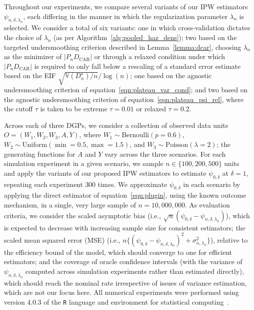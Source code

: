 Throughout our experiments, we compare several variants of our IPW estimators
$\psi_{n,\delta,\lambda_n}$, each differing in the manner in which the
regularization parameter $\lambda_n$ is selected. We consider a total of six
variants: one in which cross-validation dictates the choice of $\lambda_n$ (as
per Algorithm~\ref{alg:pooled_haz_dens}); two based on the targeted
undersmoothing criterion described in Lemma~\ref{lemma:dcar}, choosing
$\lambda_n$ as the minimizer of $\lvert P_n D_\text{CAR} \rvert$ or through
a relaxed condition under which $\lvert P_n D_\text{CAR} \rvert$ is required to
only fall below a rescaling of a standard error estimate based on the EIF
$\sqrt{\mathbb{V}(D^{\star}_n) / n}/ \log(n)$; one based on the agnostic
undersmoothing criterion of equation~\eqref{eqn:plateau_var_cond}; and two based
on the agnostic undersmoothing criterion of
equation~\eqref{eqn:plateau_psi_rel}, where the cutoff $\tau$ is taken to be
extreme $\tau = 0.01$ or relaxed $\tau = 0.2$.

Across each of three DGPs, we consider a collection of observed data units $O
= (W_1, W_2, W_3, \allowbreak A, Y)$, where $W_1 \sim \text{Bernoulli}(p
= 0.6)$, $W_2 \sim \text{Uniform}(\min = 0.5, \max = 1.5)$, and $W_3 \sim
\text{Poisson}(\lambda = 2)$; the generating functions for $A$ and $Y$ vary
across the three scenarios. For each simulation experiment in a given scenario,
we sample $n \in \{100, 200, 500\}$ units and apply the variants of our proposed
IPW estimators to estimate $\psi_{0,\delta}$ at $\delta = 1$, repeating each
experiment $300$ times. We approximate $\psi_{0,\delta}$ in each scenario by
applying the direct estimator of equation~\eqref{eqn:plugin}, using the known
outcome mechanism, in a single, very large sample of $n = 10,000,000$. As
evaluation criteria, we consider the scaled asymptotic bias (i.e.,
$\sqrt{n}(\psi_{0,\delta} - \psi_{n,\delta,\lambda_n})$), which is expected to
decrease with increasing sample size for consistent estimators; the scaled mean
squared error (MSE) (i.e., $n \{(\psi_{0,\delta} - \psi_{n,\delta,\lambda_n})^2
+ \sigma_{n,\lambda_n}^2\}$), relative to the efficiency bound of the model,
which should converge to one for efficient estimators; and the coverage of
oracle confidence intervals (with the variance of $\psi_{n,\delta,\lambda_n}$
computed across simulation experiments rather than estimated directly), which
should reach the nominal rate irrespective of issues of variance estimation,
which are not our focus here. All numerical experiments were performed using
version 4.0.3 of the \texttt{R} language and environment for statistical
computing~\citep{R}.

